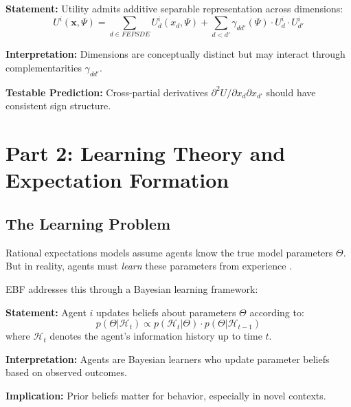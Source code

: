 \begin{tcolorbox}[colback=gray!5!white, colframe=gray!75!black,
    title=Axiom AZ-M2: Dimensional Separability]
\textbf{Statement:} Utility admits additive separable representation across dimensions:
\begin{equation}
U^i(\mathbf{x}, \Psi) = \sum_{d \in FEPSDE} U^i_d(x_d, \Psi) + \sum_{d < d'} \gamma_{dd'}(\Psi) \cdot U^i_d \cdot U^i_{d'}
\end{equation}

\textbf{Interpretation:} Dimensions are conceptually distinct but may interact
through complementarities $\gamma_{dd'}$.

\textbf{Testable Prediction:} Cross-partial derivatives $\partial^2 U / \partial x_d \partial x_{d'}$
should have consistent sign structure.
\end{tcolorbox}


\section{Part 2: Learning Theory and Expectation Formation}
\label{sec:az-learning}

\subsection{The Learning Problem}

Rational expectations models assume agents know the true model parameters
$\Theta$. But in reality, agents must \textit{learn} these parameters from
experience \citep{sargent1993bounded, evans2001learning}.

EBF addresses this through a Bayesian learning framework:

\begin{tcolorbox}[colback=gray!5!white, colframe=gray!75!black,
    title=Axiom AZ-L1: Bayesian Parameter Learning]
\textbf{Statement:} Agent $i$ updates beliefs about parameters $\Theta$ according to:
\begin{equation}
p(\Theta | \mathcal{H}_t) \propto p(\mathcal{H}_t | \Theta) \cdot p(\Theta | \mathcal{H}_{t-1})
\end{equation}
where $\mathcal{H}_t$ denotes the agent's information history up to time $t$.

\textbf{Interpretation:} Agents are Bayesian learners who update parameter beliefs
based on observed outcomes.

\textbf{Implication:} Prior beliefs matter for behavior, especially in novel contexts.
\end{tcolorbox}

